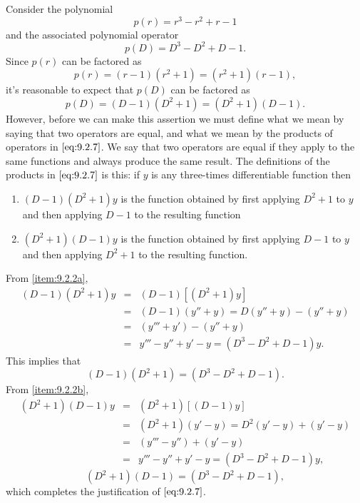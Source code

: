 \documentclass{ximera}
\begin{document}
\begin{example}\label{example:9.2.2}
Consider the polynomial
$$
p(r)=r^3-r^2+r-1
$$
and the associated polynomial operator
$$
p(D)=D^3-D^2+D-1.
$$
Since $p(r)$ can be factored as
$$
p(r)=(r-1)(r^2+1)=(r^2+1)(r-1),
$$
it's reasonable to expect that $p(D)$ can be factored as
\begin{equation} \label{eq:9.2.7}
p(D)=(D-1)(D^2+1)=(D^2+1)(D-1).
\end{equation}
However, before we can make this assertion we must define
 what we mean by saying that two operators are equal, and what we mean by the products of operators in $\eqref{eq:9.2.7}$. We say that two
operators are equal if they apply to the same functions and always produce the same result. The definitions of the products in $\eqref{eq:9.2.7}$ is this: if $y$ is any three-times differentiable
function then
\begin{enumerate}
\item\label{item:9.2.2a} %
$(D-1)(D^2+1)y$
is the function obtained by first applying $D^2+1$ to $y$ and then
applying $D-1$ to the resulting function
\item\label{item:9.2.2b} %
$(D^2+1)(D-1)y$
is the function obtained by first applying $D-1$ to $y$ and then
applying $D^2+1$ to the resulting function.
\end{enumerate}
From \ref{item:9.2.2a},
\begin{equation} \label{eq:9.2.8}
\begin{array}{rcl}
(D-1)(D^2+1)y&=&(D-1)[(D^2+1)y]\\
&=&(D-1)(y''+y)=D(y''+y)-(y''+y)\\&=&(y'''+y')-(y''+y)\\
&=&y'''-y''+y'-y=(D^3-D^2+D-1)y.
\end{array}
\end{equation}
This implies that
$$
(D-1)(D^2+1)=(D^3-D^2+D-1).
$$
From \ref{item:9.2.2b},
\begin{equation} \label{eq:9.2.9}
\begin{array}{rcl}
(D^2+1)(D-1)y&=&(D^2+1)[(D-1)y]\\
&=&(D^2+1)(y'-y)=D^2(y'-y)+(y'-y)\\&=&(y'''-y'')+(y'-y)\\
&=&y'''-y''+y'-y=(D^3-D^2+D-1)y,
\end{array}
\end{equation}
$$
(D^2+1)(D-1)=(D^3-D^2+D-1),
$$
which completes the justification of $\eqref{eq:9.2.7}$.
\end{example}
\end{document}
